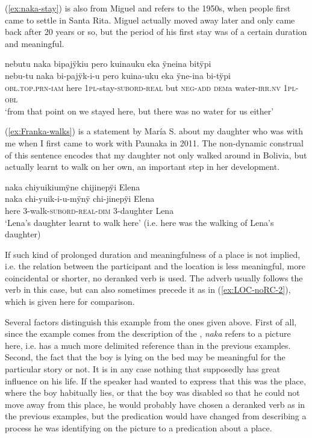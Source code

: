 (\ref{ex:naka-stay}) is also from Miguel and refers to the 1950s, when people first came to settle in Santa Rita. Miguel actually moved away later and only came back after 20 years or so, but the period of his first stay was of a certain duration and meaningful.

\ea\label{ex:naka-stay}
\begingl
\glpreamble nebutu naka bipajÿkiu pero kuinauku eka ÿneina bitÿpi\\
\gla nebu-tu naka bi-pajÿk-i-u pero kuina-uku eka ÿne-ina bi-tÿpi\\
\textsc{obl.top.prn}-\textsc{iam} here 1\textsc{pl}-stay-\textsc{subord}-\textsc{real} but \textsc{neg}-\textsc{add} \textsc{dem}a water-\textsc{irr.nv} 1\textsc{pl}-\textsc{obl}\\
\glft ‘from that point on we stayed here, but there was no water for us either’
\endgl
\trailingcitation{[mxx-p110825l.060]}
\xe

(\ref{ex:Franka-walks}) is a statement by María S. about my daughter who was with me when I first came to work with Paunaka in 2011. The non-dynamic construal of this sentence encodes that my daughter not only walked around in Bolivia, but actually learnt to walk on her own, an important step in her development.

\ea\label{ex:Franka-walks}
\begingl
\glpreamble naka chiyuikiumÿne chijinepÿi Elena\\
\gla naka chi-yuik-i-u-mÿnÿ chi-jinepÿi Elena\\
\glb here 3-walk-\textsc{subord}-\textsc{real}-\textsc{dim} 3-daughter Lena\\
\glft ‘Lena’s daughter learnt to walk here’ (i.e. here was the walking of Lena’s daughter)
\endgl
\trailingcitation{[rxx-e121128s-1.069]}
\xe

If such kind of prolonged duration and meaningfulness of a place is not implied, i.e. the relation between the participant and the location is less meaningful, more coincidental or shorter, no deranked verb is used. The adverb usually follows the verb in this case, but can also sometimes precede it as in (\ref{ex:LOC-noRC-2}), which is given here for comparison.

Several factors distinguish this example from the ones given above. First of all, since the example comes from the description of the , \textit{naka} refers to a picture here, i.e. has a much more delimited reference than in the previous examples. Second, the fact that the boy is lying on the bed may be meaningful for the particular story or not. It is in any case nothing that supposedly has great influence on his life. If the speaker had wanted to express that this was the place, where the boy habitually lies, or that the boy was disabled so that he could not move away from this place, he would probably have chosen a deranked verb as in the previous examples, but the predication would have changed from describing a process he was identifying on the picture to a predication about a place. 

